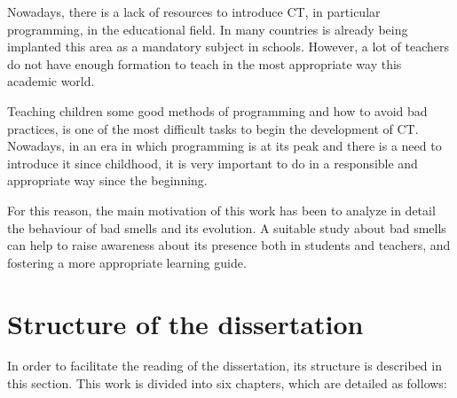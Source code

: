 Nowadays, there is a lack of resources to introduce CT, in particular programming, in the educational field. In many countries is already being implanted this area as a mandatory subject in schools. However, a lot of teachers do not have enough formation to teach in the most appropriate way this academic world. 

Teaching children some good methods of programming and how to avoid bad practices, is one of the most difficult tasks to begin the development of CT. Nowadays, in an era in which programming is at its peak and there is a need to introduce it since childhood, it is very important to do in a responsible and appropriate way since the beginning. 

For this reason, the main motivation of this work has been to analyze in detail the behaviour of bad smells and its evolution. A suitable study about bad smells can help to raise awareness about its presence both in students and teachers, and fostering a more appropriate learning guide.


\section{Structure of the dissertation}
\label{sec:structure}

In order to facilitate the reading of the dissertation, its structure is described in this section. This work is divided into six chapters, which are detailed as follows:

